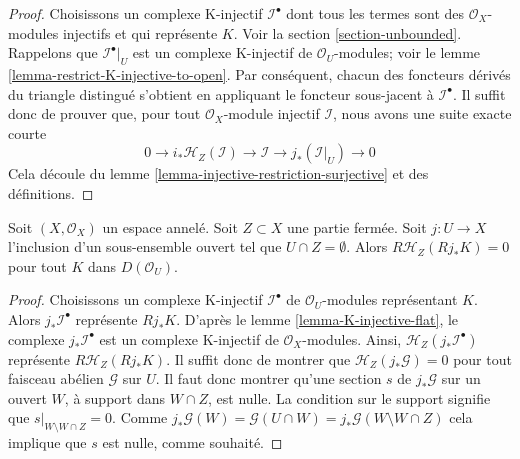 {\begin{proof}

Choisissons un complexe K-injectif $\mathcal{I}^\bullet$ dont tous les termes sont des $\mathcal{O}_X$-modules injectifs et qui représente $K$. Voir la section \ref{section-unbounded}. Rappelons que $\mathcal{I}^\bullet|_U$
est un complexe K-injectif de $\mathcal{O}_U$-modules; voir le lemme \ref{lemma-restrict-K-injective-to-open}. Par conséquent, chacun des foncteurs dérivés du triangle distingué s'obtient en appliquant le foncteur sous-jacent à $\mathcal{I}^\bullet$. Il suffit donc de prouver que, pour tout $\mathcal{O}_X$-module injectif $\mathcal{I}$, nous avons une suite exacte courte
$$
0 \to i_*\mathcal{H}_Z(\mathcal{I}) \to \mathcal{I}
\to j_*(\mathcal{I}|_U) \to 0
$$
Cela découle du lemme \ref{lemma-injective-restriction-surjective}
et des définitions.

\end{proof}

\begin{lemma}

\label{lemma-sections-support-in-closed-disjoint-open}
Soit $(X, \mathcal{O}_X)$ un espace annelé. Soit $Z \subset X$ une partie fermée. Soit $j : U \to X$ l'inclusion d'un sous-ensemble ouvert tel que $U \cap Z = \emptyset$. Alors $R\mathcal{H}_Z(Rj_*K) = 0$ pour tout $K$ dans $D(\mathcal{O}_U)$.
\end{lemma}

\begin{proof}

Choisissons un complexe K-injectif $\mathcal{I}^\bullet$ de $\mathcal{O}_U$-modules représentant $K$. Alors $j_*\mathcal{I}^\bullet$ représente $Rj_*K$. D'après le lemme \ref{lemma-K-injective-flat}, le complexe $j_*\mathcal{I}^\bullet$ est un complexe K-injectif de $\mathcal{O}_X$-modules. Ainsi,
$\mathcal{H}_Z(j_*\mathcal{I}^\bullet)$ représente $R\mathcal{H}_Z(Rj_*K)$. Il suffit donc de montrer que $\mathcal{H}_Z(j_*\mathcal{G}) = 0$
pour tout faisceau abélien $\mathcal{G}$ sur $U$. Il faut donc montrer qu'une section $s$ de $j_*\mathcal{G}$ sur un ouvert $W$, à support dans $W \cap Z$, est nulle. La condition sur le support signifie que
$s|_{W \setminus W \cap Z} = 0$. Comme $j_*\mathcal{G}(W) =
\mathcal{G}(U \cap W) = j_*\mathcal{G}(W \setminus W \cap Z)$
cela implique que $s$ est nulle, comme souhaité.

\end{proof}

\begin{lemma}


\end{lemma}}
